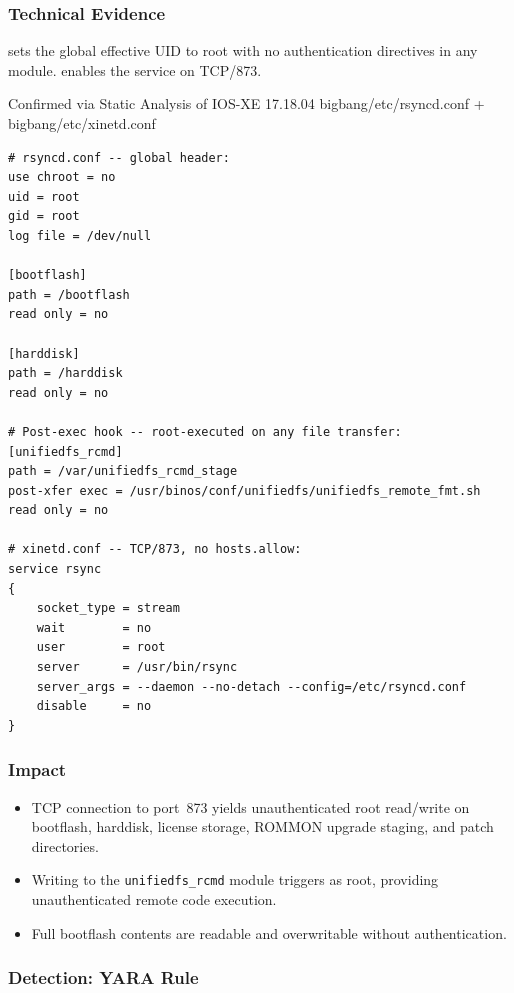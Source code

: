 \documentclass[11pt,a4paper]{article}
\begin{document}
\subsubsection{Technical Evidence}

 sets the global effective UID to root with no
authentication directives in any module.  enables
the service on TCP/873.

\begin{pocbox}{Confirmed via Static Analysis of IOS-XE 17.18.04 bigbang/etc/rsyncd.conf + bigbang/etc/xinetd.conf}
\begin{lstlisting}
# rsyncd.conf -- global header:
use chroot = no
uid = root
gid = root
log file = /dev/null

[bootflash]
path = /bootflash
read only = no

[harddisk]
path = /harddisk
read only = no

# Post-exec hook -- root-executed on any file transfer:
[unifiedfs_rcmd]
path = /var/unifiedfs_rcmd_stage
post-xfer exec = /usr/binos/conf/unifiedfs/unifiedfs_remote_fmt.sh
read only = no

# xinetd.conf -- TCP/873, no hosts.allow:
service rsync
{
    socket_type = stream
    wait        = no
    user        = root
    server      = /usr/bin/rsync
    server_args = --daemon --no-detach --config=/etc/rsyncd.conf
    disable     = no
}
\end{lstlisting}
\end{pocbox}

\subsubsection{Impact}

\begin{itemize}[nosep]
  \item TCP connection to port~873 yields unauthenticated root read/write on
    bootflash, harddisk, license storage, ROMMON upgrade staging, and patch
    directories.
  \item Writing to the \texttt{unifiedfs\_rcmd} module triggers
     as root, providing
    unauthenticated remote code execution.
  \item Full bootflash contents are readable and overwritable without authentication.
\end{itemize}

\subsubsection{Detection: YARA Rule}
\end{document}
